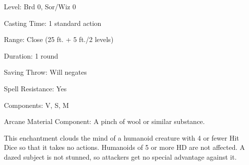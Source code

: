 
\begin{description*}
\item[Level:] Brd 0, Sor/Wiz 0
\item[Casting Time:] 1 standard action
\item[Range:] Close (25 ft. + 5 ft./2 levels)
\item[Duration:] 1 round
\item[Saving Throw:] Will negates
\item[Spell Resistance:] Yes
\item[Components:] V, S, M
\item[Arcane Material Component:] A pinch of wool or similar substance.
\end{description*}

This enchantment clouds the mind of a humanoid creature with 4 or fewer Hit Dice
so that it takes no actions. Humanoids of 5 or more HD are not affected. A dazed
subject is not stunned, so attackers get no special advantage against it.